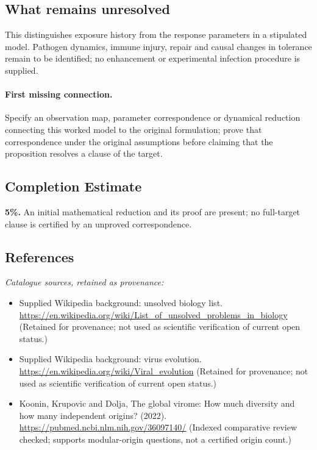 \documentclass[11pt]{article}
\begin{document}
\subsection{What remains unresolved}
This distinguishes exposure history from the response parameters in a stipulated model. Pathogen dynamics, immune injury, repair and causal changes in tolerance remain to be identified; no enhancement or experimental infection procedure is supplied.
\paragraph{First missing connection.} Specify an observation map, parameter correspondence or dynamical reduction connecting this worked model to the original formulation; prove that correspondence under the original assumptions before claiming that the proposition resolves a clause of the target.
\subsection{Completion Estimate}
\textbf{5\%.} An initial mathematical reduction and its proof are present; no full-target clause is certified by an unproved correspondence.
\subsection{References}
\noindent\emph{Catalogue sources, retained as provenance:}
\begin{itemize}
\item Supplied Wikipedia background: unsolved biology list. \url{https://en.wikipedia.org/wiki/List_of_unsolved_problems_in_biology} (Retained for provenance; not used as scientific verification of current open status.)
\item Supplied Wikipedia background: virus evolution. \url{https://en.wikipedia.org/wiki/Viral_evolution} (Retained for provenance; not used as scientific verification of current open status.)
\item Koonin, Krupovic and Dolja, The global virome: How much diversity and how many independent origins? (2022). \url{https://pubmed.ncbi.nlm.nih.gov/36097140/} (Indexed comparative review checked; supports modular-origin questions, not a certified origin count.)
\end{itemize}
\clearpage


\appendix
\end{document}
